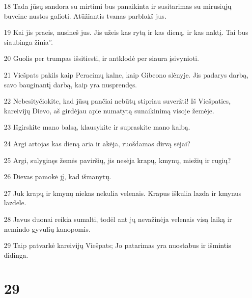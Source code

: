 \par 18 Tada jūsų sandora su mirtimi bus panaikinta ir susitarimas su mirusiųjų buveine nustos galioti. Atūžiantis tvanas parblokš jus. 
\par 19 Kai jis praeis, nusineš jus. Jis užeis kas rytą ir kas dieną, ir kas naktį. Tai bus siaubinga žinia”. 
\par 20 Guolis per trumpas išsitiesti, ir antklodė per siaura įsivynioti. 
\par 21 Viešpats pakils kaip Peracimų kalne, kaip Gibeono slėnyje. Jis padarys darbą, savo bauginantį darbą, kaip yra nusprendęs. 
\par 22 Nebesityčiokite, kad jūsų pančiai nebūtų stipriau suveržti! Iš Viešpaties, kareivijų Dievo, aš girdėjau apie numatytą sunaikinimą visoje žemėje. 
\par 23 Išgirskite mano balsą, klausykite ir supraskite mano kalbą. 
\par 24 Argi artojas kas dieną aria ir akėja, ruošdamas dirvą sėjai? 
\par 25 Argi, sulyginęs žemės paviršių, jis nesėja krapų, kmynų, miežių ir rugių? 
\par 26 Dievas pamokė jį, kad išmanytų. 
\par 27 Juk krapų ir kmynų niekas nekulia velenais. Krapus iškulia lazda ir kmynus lazdele. 
\par 28 Javus duonai reikia sumalti, todėl ant jų nevažinėja velenais visą laiką ir nemindo gyvulių kanopomis. 
\par 29 Taip patvarkė kareivijų Viešpats; Jo patarimas yra nuostabus ir išmintis didinga.



\chapter{29}


